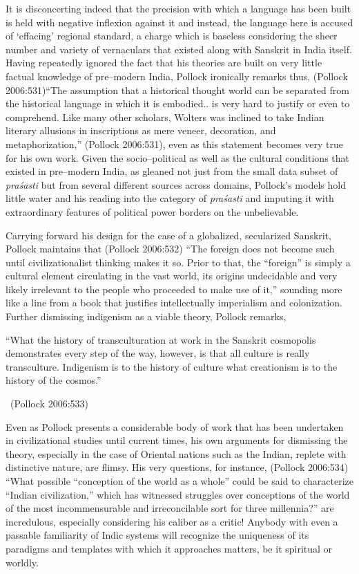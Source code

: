 It is disconcerting indeed that the precision with which a language has been built is held with negative inflexion against it and instead, the language here is accused of ‘effacing’ regional standard, a charge which is baseless considering the sheer number and variety of vernaculars that existed along with Sanskrit in India itself. Having repeatedly ignored the fact that his theories are built on very little factual knowledge of pre–modern India, Pollock ironically remarks thus, (Pollock 2006:531)“The assumption that a historical thought world can be separated from the historical language in which it is embodied.. is very hard to justify or even to comprehend. Like many other scholars, Wolters was inclined to take Indian literary allusions in inscriptions as mere veneer, decoration, and metaphorization,” (Pollock 2006:531), even as this statement becomes very true for his own work. Given the socio–political as well as the cultural conditions that existed in pre–modern India, as gleaned not just from the small data subset of \textit{praśasti} but from several different sources across domains, Pollock’s models hold little water and his reading into the category of \textit{praśasti} and imputing it with extraordinary features of political power borders on the unbelievable.

Carrying forward his design for the case of a globalized, secularized Sanskrit, Pollock maintains that (Pollock 2006:532) “The foreign does not become such until civilizationalist thinking makes it so. Prior to that, the “foreign” is simply a cultural element circulating in the vast world, its origins undecidable and very likely irrelevant to the people who proceeded to make use of it,” sounding more like a line from a book that justifies intellectually imperialism and colonization. Further dismissing indigenism as a viable theory, Pollock remarks,

\begin{myquote}
“What the history of transculturation at work in the Sanskrit cosmopolis demonstrates every step of the way, however, is that all culture is really transculture. Indigenism is to the history of culture what creationism is to the history of the cosmos.” 

~\hfill (Pollock 2006:533)
\end{myquote}

Even as Pollock presents a considerable body of work that has been undertaken in civilizational studies until current times, his own arguments for dismissing the theory, especially in the case of Oriental nations such as the Indian, replete with distinctive nature, are flimsy. His very questions, for instance, (Pollock 2006:534) “What possible “conception of the world as a whole” could be said to characterize “Indian civilization,” which has witnessed struggles over conceptions of the world of the most incommensurable and irreconcilable sort for three millennia?” are incredulous, especially considering his caliber as a critic! Anybody with even a passable familiarity of Indic systems will recognize the uniqueness of its paradigms and templates with which it approaches matters, be it spiritual or worldly.

